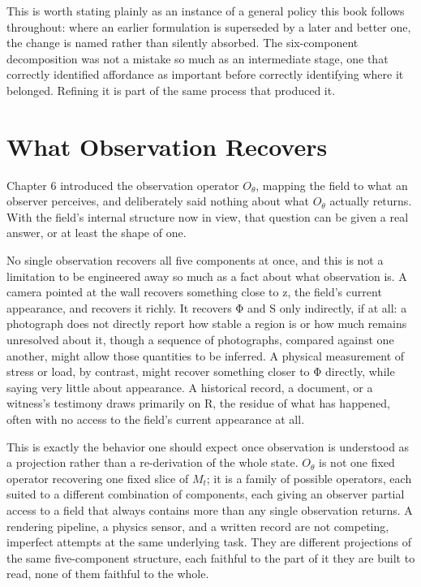 This is worth stating plainly as an instance of a general policy this book follows throughout: where an earlier formulation is superseded by a later and better one, the change is named rather than silently absorbed. The six-component decomposition was not a mistake so much as an intermediate stage, one that correctly identified affordance as important before correctly identifying where it belonged. Refining it is part of the same process that produced it.

\section{What Observation Recovers}

Chapter 6 introduced the observation operator \(O_\theta\), mapping the field to what an observer perceives, and deliberately said nothing about what \(O_\theta\) actually returns. With the field's internal structure now in view, that question can be given a real answer, or at least the shape of one.

No single observation recovers all five components at once, and this is not a limitation to be engineered away so much as a fact about what observation is. A camera pointed at the wall recovers something close to z, the field's current appearance, and recovers it richly. It recovers Φ and S only indirectly, if at all: a photograph does not directly report how stable a region is or how much remains unresolved about it, though a sequence of photographs, compared against one another, might allow those quantities to be inferred. A physical measurement of stress or load, by contrast, might recover something closer to Φ directly, while saying very little about appearance. A historical record, a document, or a witness's testimony draws primarily on R, the residue of what has happened, often with no access to the field's current appearance at all.

This is exactly the behavior one should expect once observation is understood as a projection rather than a re-derivation of the whole state. \(O_\theta\) is not one fixed operator recovering one fixed slice of \(M_t\); it is a family of possible operators, each suited to a different combination of components, each giving an observer partial access to a field that always contains more than any single observation returns. A rendering pipeline, a physics sensor, and a written record are not competing, imperfect attempts at the same underlying task. They are different projections of the same five-component structure, each faithful to the part of it they are built to read, none of them faithful to the whole.

